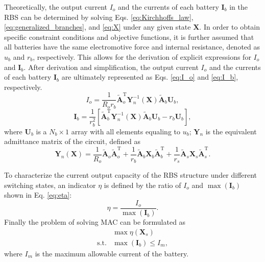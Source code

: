 \documentclass{article}
\def\T{\mathrm{T}}
\begin{document}
Theoretically, the output current $I_o$ and the currents of each battery $\bm{I}_b$ in the RBS  can be determined by solving Eqs. \ref{eq:Kirchhoffs_law}, \ref{eq:generalized_branches}, and \ref{eq:X} under any given state $\bm{X}$.
In order to obtain specific constraint conditions and objective functions, it is further assumed that all batteries have the same electromotive force and internal resistance, denoted as $u_b$ and $r_b$, respectively.
This allows for the derivation of explicit expressions for $I_o$ and $\bm{I}_b$.
After derivation and simplification, the output current $I_o$ and the currents of each battery $\bm{I}_b$ are ultimately represented as Eqs. \ref{eq:I_o} and \ref{eq:I_b}, respectively.
\begin{equation}\label{eq:I_o}
    I_o = \frac{1}{R_o r_b} \bm{\tilde{A}}_o^\T \bm{Y}_n^{-1}(\bm{X}) \bm{\tilde{A}}_b \bm{U}_b,
\end{equation}
\begin{equation}\label{eq:I_b}
    \bm{I}_b = \frac{1}{r_b^2}[\bm{\tilde{A}}_b^\T \bm{Y}_n^{-1}(\bm{X}) \bm{\tilde{A}}_b\bm{U}_b -r_b \bm{U}_b],
\end{equation}
where $\bm{U}_b$ is a $N_b\times 1$ array with all elements equaling to $u_b$;
$\bm{Y}_n$ is the equivalent admittance matrix of the circuit, defined as
\begin{equation}\label{eq:Yn}
    \bm{Y}_n (\bm{X}) = \frac{1}{R_o} \bm{\tilde{A}}_o\bm{\tilde{A}}_o^\T + \frac{1}{r_b} \bm{\tilde{A}}_b\bm{X}_b\bm{\tilde{A}}_b^\T + \frac{1}{r_s}\bm{\tilde{A}}_s\bm{X}_s\bm{\tilde{A}}_s^\T.
\end{equation}


To characterize the current output capacity of the RBS structure under different switching states, an indicator $\eta$ is defined by the ratio of $I_o$ and $\max (\bm{I}_b)$ shown in Eq. \ref{eq:eta}:
\begin{equation}\label{eq:eta}
    \eta = \frac{I_o}{\max (\bm{I}_b)}.
\end{equation}
Finally the problem of solving MAC can be formulated as
\begin{align}
    & \max \eta(\bm{X}_s) \label{eq:max_eta}\\
    \text{s.t.} & \max (\bm{I}_b) \leq I_m, \label{eq:Ib_leq_Im}
\end{align}
where $I_m$ is the maximum allowable current of the battery.
\end{document}
